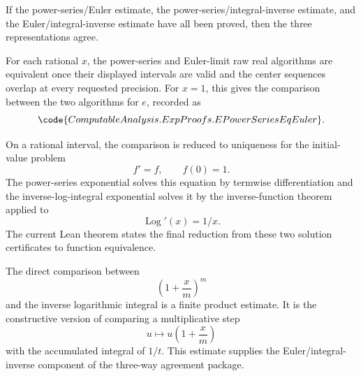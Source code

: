 \begin{theorem}
\label{thm:exp-three-way-agreement-from-estimates}
\leanok
If the power-series/Euler estimate, the power-series/integral-inverse
estimate, and the Euler/integral-inverse estimate have all been proved, then
the three representations agree.
\end{theorem}

\begin{theorem}
\label{thm:exp-power-series-euler}
For each rational \(x\), the power-series and Euler-limit raw real
algorithms are equivalent once their displayed intervals are valid and the
center sequences overlap at every requested precision.  For \(x=1\), this
gives the comparison between the two algorithms for \(e\), recorded as
\[
  \code{ComputableAnalysis.ExpProofs.EPowerSeriesEqEuler}.
\]
\end{theorem}

\begin{theorem}
\label{thm:exp-power-series-log-integral}
\leanok
On a rational interval, the comparison is reduced to uniqueness for the
initial-value problem
\[
  f'=f,\qquad f(0)=1.
\]
The power-series exponential solves this equation by termwise
differentiation and the inverse-log-integral exponential solves it by the
inverse-function theorem applied to
\[
  \operatorname{Log}'(x)=1/x.
\]
The current Lean theorem states the final reduction from these two solution
certificates to function equivalence.
\end{theorem}

\begin{definition}
\label{def:exp-euler-log-integral-estimate}
\leanok
The direct comparison between
\[
  \left(1+\frac{x}{m}\right)^m
\]
and the inverse logarithmic integral is a finite product estimate.  It is the
constructive version of comparing a multiplicative step
\[
  u\longmapsto u\left(1+\frac{x}{m}\right)
\]
with the accumulated integral of \(1/t\).  This estimate supplies the
Euler/integral-inverse component of the three-way agreement package.
\end{definition}

